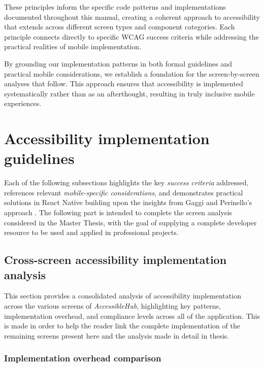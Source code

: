 These principles inform the specific code patterns and implementations documented throughout this manual, creating a coherent approach to accessibility that extends across different screen types and component categories. Each principle connects directly to specific WCAG success criteria while addressing the practical realities of mobile implementation.

By grounding our implementation patterns in both formal guidelines and practical mobile considerations, we establish a foundation for the screen-by-screen analyses that follow. This approach ensures that accessibility is implemented systematically rather than as an afterthought, resulting in truly inclusive mobile experiences.

\FloatBarrier

\section{Accessibility implementation guidelines}
\label{sec:implementation-guidelines}

Each of the following subsections highlights the key \textit{success criteria} addressed, references relevant \textit{mobile-specific considerations}, and demonstrates practical solutions in React Native building upon the insights from Gaggi and Perinello's approach \cite{budai2024mobile}. The following part is intended to complete the screen analysis considered in the Master Thesis, with the goal of supplying a complete developer resource to be used and applied in professional projects.

\subsection{Cross-screen accessibility implementation analysis}
\label{subsec:cross-screen-analysis}

This section provides a consolidated analysis of accessibility implementation across the various screens of \textit{AccessibleHub}, highlighting key patterns, implementation overhead, and compliance levels across all of the application. This is made in order to help the reader link the complete implementation of the remaining screens present here and the analysis made in detail in thesis.

\subsubsection{Implementation overhead comparison}

